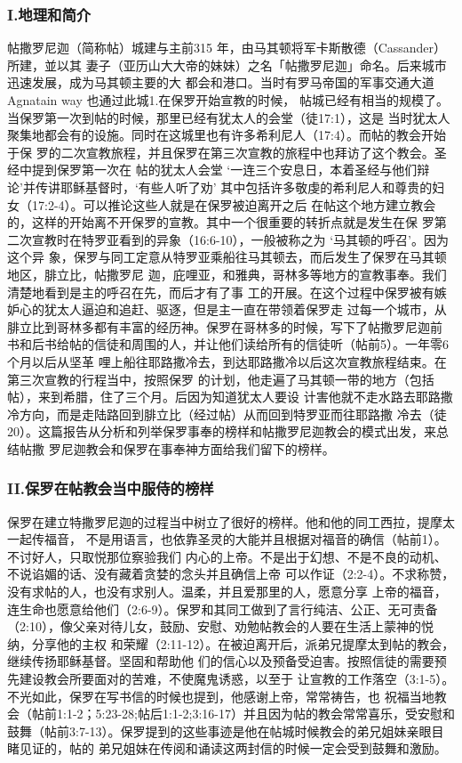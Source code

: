 \subsubsection{I.地理和简介}
帖撒罗尼迦（简称帖）城建与主前315 年，由马其顿将军卡斯散德（Cassander）所建，並以其
妻子（亚历山大大帝的妹妹）之名「帖撒罗尼迦」命名。后来城市迅速发展，成为马其顿主要的大
都会和港口。当时有罗马帝国的军事交通大道 Agnatain way 也通过此城1.在保罗开始宣教的时候，
帖城已经有相当的规模了。当保罗第一次到帖的时候，那里已经有犹太人的会堂（徒17:1），这是
当时犹太人聚集地都会有的设施。同时在这城里也有许多希利尼人（17:4）。而帖的教会开始于保
罗的二次宣教旅程，并且保罗在第三次宣教的旅程中也拜访了这个教会。圣经中提到保罗第一次在
帖的犹太人会堂 ‘一连三个安息日，本着圣经与他们辩论’并传讲耶稣基督时，‘有些人听了劝’
其中包括许多敬虔的希利尼人和尊贵的妇女（17:2-4）。可以推论这些人就是在保罗被迫离开之后
在帖这个地方建立教会的，这样的开始离不开保罗的宣教。其中一个很重要的转折点就是发生在保
罗第二次宣教时在特罗亚看到的异象（16:6-10），一般被称之为 ‘马其顿的呼召’。因为这个异
象，保罗与同工定意从特罗亚乘船往马其顿去，而后发生了保罗在马其顿地区，腓立比，帖撒罗尼
迦，庇哩亚，和雅典，哥林多等地方的宣教事奉。我们清楚地看到是主的呼召在先，而后才有了事
工的开展。在这个过程中保罗被有嫉妒心的犹太人逼迫和追赶、驱逐，但是主一直在带领着保罗走
过每一个城市，从腓立比到哥林多都有丰富的经历神。保罗在哥林多的时候，写下了帖撒罗尼迦前
书和后书给帖的信徒和周围的人，并让他们读给所有的信徒听（帖前5）。一年零6 个月以后从坚革
哩上船往耶路撒冷去，到达耶路撒冷以后这次宣教旅程结束。在第三次宣教的行程当中，按照保罗
的计划，他走遍了马其顿一带的地方（包括帖），来到希腊，住了三个月。后因为知道犹太人要设
计害他就不走水路去耶路撒冷方向，而是走陆路回到腓立比（经过帖）从而回到特罗亚而往耶路撒
冷去（徒20）。这篇报告从分析和列举保罗事奉的榜样和帖撒罗尼迦教会的模式出发，来总结帖撒
罗尼迦教会和保罗在事奉神方面给我们留下的榜样。
\subsubsection{II.保罗在帖教会当中服侍的榜样}
保罗在建立特撒罗尼迦的过程当中树立了很好的榜样。他和他的同工西拉，提摩太一起传福音，
不是用语言，也依靠圣灵的大能并且根据对福音的确信（帖前1）。不讨好人，只取悦那位察验我们
内心的上帝。不是出于幻想、不是不良的动机、不说谄媚的话、没有藏着贪婪的念头并且确信上帝
可以作证（2:2-4）。不求称赞，没有求帖的人，也没有求别人。温柔，并且爱那里的人，愿意分享
上帝的福音，连生命也愿意给他们（2:6-9）。保罗和其同工做到了言行纯洁、公正、无可责备
（2:10），像父亲对待儿女，鼓励、安慰、劝勉帖教会的人要在生活上蒙神的悦纳，分享他的主权
和荣耀（2:11-12）。在被迫离开后，派弟兄提摩太到帖的教会，继续传扬耶稣基督。坚固和帮助他
们的信心以及预备受迫害。按照信徒的需要预先建设教会所要面对的苦难，不使魔鬼诱惑，以至于
让宣教的工作落空（3:1-5）。不光如此，保罗在写书信的时候也提到，他感谢上帝，常常祷告，也
祝福当地教会（帖前1:1-2；5:23-28;帖后1:1-2;3:16-17）并且因为帖的教会常常喜乐，受安慰和
鼓舞（帖前3:7-13）。保罗提到的这些事迹是他在帖城时候教会的弟兄姐妹亲眼目睹见证的，帖的
弟兄姐妹在传阅和诵读这两封信的时候一定会受到鼓舞和激励。
